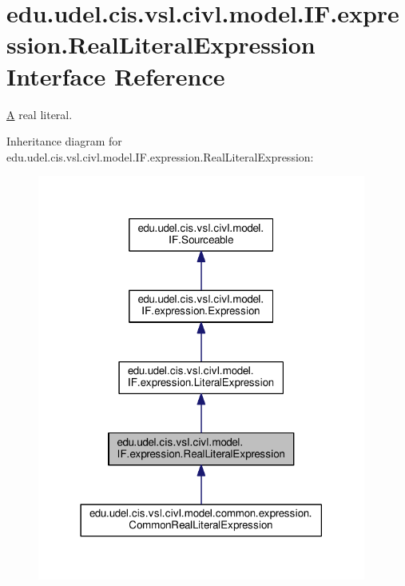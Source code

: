 \hypertarget{interfaceedu_1_1udel_1_1cis_1_1vsl_1_1civl_1_1model_1_1IF_1_1expression_1_1RealLiteralExpression}{}\section{edu.\+udel.\+cis.\+vsl.\+civl.\+model.\+I\+F.\+expression.\+Real\+Literal\+Expression Interface Reference}
\label{interfaceedu_1_1udel_1_1cis_1_1vsl_1_1civl_1_1model_1_1IF_1_1expression_1_1RealLiteralExpression}


\hyperlink{structA}{A} real literal.  




Inheritance diagram for edu.\+udel.\+cis.\+vsl.\+civl.\+model.\+I\+F.\+expression.\+Real\+Literal\+Expression\+:
\nopagebreak
\begin{figure}[H]
\begin{center}
\leavevmode
\includegraphics[width=306pt]{interfaceedu_1_1udel_1_1cis_1_1vsl_1_1civl_1_1model_1_1IF_1_1expression_1_1RealLiteralExpression__inherit__graph}
\end{center}
\end{figure}


